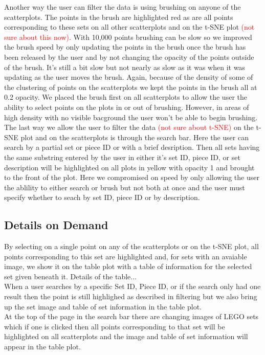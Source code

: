 \documentclass[a4paper, 11pt]{article}
\begin{document}
Another way the user can filter the data is using brushing on anyone of the scatterplots. The points in the brush are highlighted red as are all points corresponding to these sets on all other scatterplots and on the t-SNE plot \textcolor{red}{(not sure about this now)}. With 10,000 points brushing can be slow so we improved the brush speed by only updating the points in the brush once the brush has been released by the user and by not changing the opacity of the points outside of the brush. It's still a bit slow but not nearly as slow as it was when it was updating as the user moves the brush. Again, because of the density of some of the clustering of points on the scatterplots we kept the points in the brush all at 0.2 opacity. We placed the brush first on all scatterplots to allow the user the ability to select points on the plots in or out of brushing. However, in areas of high density with no visible bacground the user won't be able to begin brushing.\\

The last way we allow the user to filter the data \textcolor{red}{(not sure about t-SNE)} on the t-SNE plot and on the scatterplots is through the search bar. Here the user can search by a partial set or piece ID or with a brief desription. Then all sets having the same substring entered by the user in either it's set ID, piece ID, or set description will be highlighted on all plots in yellow with opacity 1 and brought to the front of the plot. Here we compromised on speed by only allowing the user the ablility to either search or brush but not both at once and the user must specify whether to seach by set ID, piece ID or by description.


\subsection*{Details on Demand}

By selecting on a single point on any of the scatterplots or on the t-SNE plot, all points corresponding to this set are highlighted and, for sets with an avaiable image, we show it on the table plot with a table of information for the selected set given beneath it. Details of the table...\\

When a user searches by a specific Set ID, Piece ID, or if the search only had one result then the point is still highlighed as described in filtering but we also bring up the set image and table of set information in the table plot.\\

At the top of the page in the search bar there are changing images of LEGO sets which if one is clicked then all points corresponding to that set will be highlighted on all scatterplots and the image and table of set information will appear in the table plot.\\
\end{document}
